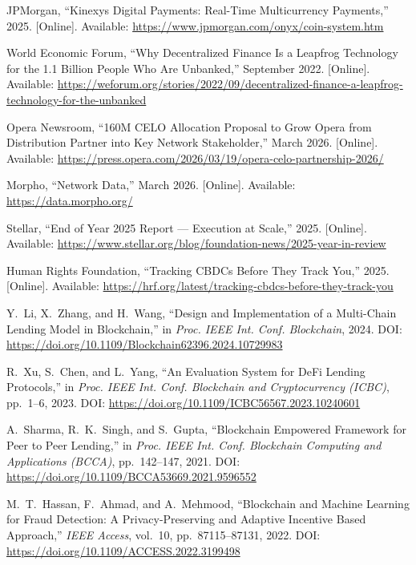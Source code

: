 \documentclass[12pt,a4paper]{report}
\begin{document}
{\begin{enumerate}[label={[\arabic*]}]
\item JPMorgan, ``Kinexys Digital Payments: Real-Time Multicurrency Payments,'' 2025. [Online]. Available: \url{https://www.jpmorgan.com/onyx/coin-system.htm}

\item World Economic Forum, ``Why Decentralized Finance Is a Leapfrog Technology for the 1.1 Billion People Who Are Unbanked,'' September 2022. [Online]. Available: \url{https://weforum.org/stories/2022/09/decentralized-finance-a-leapfrog-technology-for-the-unbanked}

\item Opera Newsroom, ``160M CELO Allocation Proposal to Grow Opera from Distribution Partner into Key Network Stakeholder,'' March 2026. [Online]. Available: \url{https://press.opera.com/2026/03/19/opera-celo-partnership-2026/}

\item Morpho, ``Network Data,'' March 2026. [Online]. Available: \url{https://data.morpho.org/}

\item Stellar, ``End of Year 2025 Report --- Execution at Scale,'' 2025. [Online]. Available: \url{https://www.stellar.org/blog/foundation-news/2025-year-in-review}

\item Human Rights Foundation, ``Tracking CBDCs Before They Track You,'' 2025. [Online]. Available: \url{https://hrf.org/latest/tracking-cbdcs-before-they-track-you}

\item Y.~Li, X.~Zhang, and H.~Wang, ``Design and Implementation of a Multi-Chain Lending Model in Blockchain,'' in \textit{Proc. IEEE Int. Conf. Blockchain}, 2024. DOI: \url{https://doi.org/10.1109/Blockchain62396.2024.10729983}

\item R.~Xu, S.~Chen, and L.~Yang, ``An Evaluation System for DeFi Lending Protocols,'' in \textit{Proc. IEEE Int. Conf. Blockchain and Cryptocurrency (ICBC)}, pp.~1--6, 2023. DOI: \url{https://doi.org/10.1109/ICBC56567.2023.10240601}

\item A.~Sharma, R.~K.~Singh, and S.~Gupta, ``Blockchain Empowered Framework for Peer to Peer Lending,'' in \textit{Proc. IEEE Int. Conf. Blockchain Computing and Applications (BCCA)}, pp.~142--147, 2021. DOI: \url{https://doi.org/10.1109/BCCA53669.2021.9596552}

\item M.~T.~Hassan, F.~Ahmad, and A.~Mehmood, ``Blockchain and Machine Learning for Fraud Detection: A Privacy-Preserving and Adaptive Incentive Based Approach,'' \textit{IEEE Access}, vol.~10, pp.~87115--87131, 2022. DOI: \url{https://doi.org/10.1109/ACCESS.2022.3199498}


\end{enumerate}}
\end{document}
